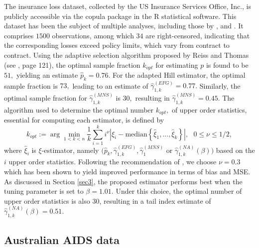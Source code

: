\documentclass[reqno,openbib,runningheads,a4paper,12pt]{amsart}%
\begin{document}
\noindent The insurance loss dataset, collected by the US Insurance Services
Office, Inc., is publicly accessible via the copula package in the R
statistical software. This dataset has been the subject of multiple analyses,
including those by \cite{FV98}, \cite{Klugman99} and \cite{DPV06}. It
comprises $1500$ observations, among which $34$ are right-censored, indicating
that the corresponding losses exceed policy limits, which vary from contract
to contract. Using the adaptive selection algorithm proposed by Reiss and
Thomas (see \citep[][]{ReTo97}, page 121), the optimal sample fraction
$k_{opt}$ for estimating $p$ is found to be $51,$ yielding an estimate
$\widehat{p}_{k}=0.76.$ For the adapted Hill estimator, the optimal sample
fraction is $73,$ leading to an estimate of $\widehat{\gamma}_{1,k}^{\left(
EFG\right)  }=0.77.$ Similarly, the optimal sample fraction for
$\widehat{\gamma}_{1,k}^{\left(  MNS\right)  }$ is $30,$ resulting in
$\widehat{\gamma}_{1,k}^{\left(  MNS\right)  }=0.45.$ The algorithm used to
determine the optimal number $k_{opt},$ of upper order statistics, essential
for computing each estimator, is defined by%
\[
k_{opt}:=\arg\min_{1<k<n}\frac{1}{k}\sum_{i=1}^{k}i^{\nu}\left\vert
\widehat{\xi}_{i}-\text{median}\left\{  \widehat{\xi}_{1},...,\widehat{\xi
}_{k}\right\}  \right\vert ,\text{ }0\leq\nu\leq1/2,
\]
where $\widehat{\xi}_{i}$ is $\xi$-estimator, namely $(\widehat{p}%
_{k},\widehat{\gamma}_{1,k}^{\left(  EFG\right)  },\widehat{\gamma}%
_{1}^{\left(  MNS\right)  }$ or $\widehat{\gamma}_{1,k}^{\left(  NA\right)
}\left(  \beta\right)  )$ based on the $i$ upper order statistics. Following
the recommendation of \cite{NF2004}, we choose $\nu=0.3$ which has been shown
to yield improved performance in terms of bias and MSE. As discussed in
Section \ref{sec3}, the proposed estimator performs best when the tuning
parameter is set to $\beta=1.01.$ Under this choice, the optimal number of
upper order statistics is also $30$, resulting in a tail index estimate of
$\widehat{\gamma}_{1,k}^{\left(  NA\right)  }\left(  \beta\right)  =0.51.$

\subsection{Australian AIDS data}
\end{document}
